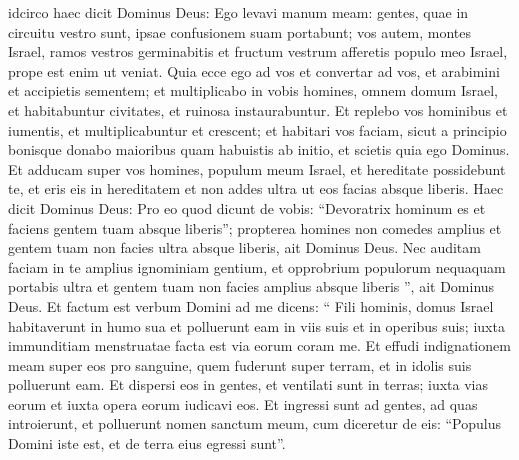 \begin{biblechapter}
\begin{biblechapter}
\begin{biblechapter}
\begin{biblechapter}
\begin{biblechapter}
\begin{biblechapter}
\begin{biblechapter}
\begin{biblechapter}
\begin{biblechapter}
\begin{biblechapter}
\begin{biblechapter}
\begin{biblechapter}
\begin{biblechapter}
\begin{biblechapter}
\begin{biblechapter}
\begin{biblechapter}
\begin{biblechapter}
\begin{biblechapter}
\begin{biblechapter}
\begin{biblechapter}
\begin{biblechapter}
\begin{biblechapter}
\begin{biblechapter}
\begin{biblechapter}
\begin{biblechapter}
\begin{biblechapter}
\begin{biblechapter}
\begin{biblechapter}
\begin{biblechapter}
\begin{biblechapter}
\begin{biblechapter}
\begin{biblechapter}
\begin{biblechapter}
\begin{biblechapter}
\begin{biblechapter}
\begin{biblechapter}
\verse idcirco haec dicit Dominus Deus: Ego levavi manum meam: gentes, quae in circuitu vestro sunt, ipsae confusionem suam portabunt; 
\verse vos autem, montes Israel, ramos vestros germinabitis et fructum vestrum afferetis populo meo Israel, prope est enim ut veniat. 
\verse Quia ecce ego ad vos et convertar ad vos, et arabimini et accipietis sementem; 
\verse et multiplicabo in vobis homines, omnem domum Israel, et habitabuntur civitates, et ruinosa instaurabuntur. 
\verse Et replebo vos hominibus et iumentis, et multiplicabuntur et crescent; et habitari vos faciam, sicut a principio bonisque donabo maioribus quam habuistis ab initio, et scietis quia ego Dominus. 
\verse Et adducam super vos homines, populum meum Israel, et hereditate possidebunt te, et eris eis in hereditatem et non addes ultra ut eos facias absque liberis.
 \verse Haec dicit Dominus Deus: Pro eo quod dicunt de vobis: “Devoratrix hominum es et faciens gentem tuam absque liberis”; 
\verse propterea homines non comedes amplius et gentem tuam non facies ultra absque liberis, ait Dominus Deus. 
\verse Nec auditam faciam in te amplius ignominiam gentium, et opprobrium populorum nequaquam portabis ultra et gentem tuam non facies amplius absque liberis ”, ait Dominus Deus. 
\verse Et factum est verbum Domini ad me dicens: 
\verse “ Fili hominis, domus Israel habitaverunt in humo sua et polluerunt eam in viis suis et in operibus suis; iuxta immunditiam menstruatae facta est via eorum coram me. 
 \verse Et effudi indignationem meam super eos pro sanguine, quem fuderunt super terram, et in idolis suis polluerunt eam. 
\verse Et dispersi eos in gentes, et ventilati sunt in terras; iuxta vias eorum et iuxta opera eorum iudicavi eos. 
 \verse Et ingressi sunt ad gentes, ad quas introierunt, et polluerunt nomen sanctum meum, cum diceretur de eis: “Populus Domini iste est, et de terra eius egressi sunt”. 

\end{biblechapter}
\end{biblechapter}
\end{biblechapter}
\end{biblechapter}
\end{biblechapter}
\end{biblechapter}
\end{biblechapter}
\end{biblechapter}
\end{biblechapter}
\end{biblechapter}
\end{biblechapter}
\end{biblechapter}
\end{biblechapter}
\end{biblechapter}
\end{biblechapter}
\end{biblechapter}
\end{biblechapter}
\end{biblechapter}
\end{biblechapter}
\end{biblechapter}
\end{biblechapter}
\end{biblechapter}
\end{biblechapter}
\end{biblechapter}
\end{biblechapter}
\end{biblechapter}
\end{biblechapter}
\end{biblechapter}
\end{biblechapter}
\end{biblechapter}
\end{biblechapter}
\end{biblechapter}
\end{biblechapter}
\end{biblechapter}
\end{biblechapter}
\end{biblechapter}
